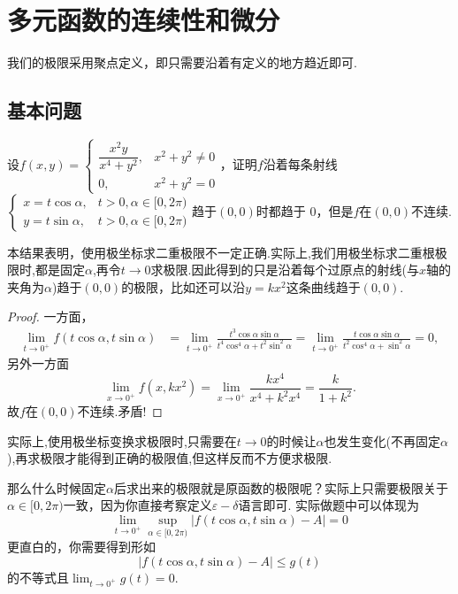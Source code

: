\documentclass[../../main.tex]{subfiles}%
\begin{document}
\section{多元函数的连续性和微分}

我们的极限采用聚点定义，即只需要沿着有定义的地方趋近即可.

\subsection{基本问题}

\begin{example}
设\(f(x,y)=\begin{cases}\dfrac{x^2 y}{x^4 + y^2},&x^2 + y^2 \neq 0\\0,&x^2 + y^2 = 0\end{cases}\)，证明\(f\)沿着每条射线\(\begin{cases}x = t\cos\alpha,&t > 0,\alpha \in [0,2\pi)\\y = t\sin\alpha,&t > 0,\alpha \in [0,2\pi)\end{cases}\)趋于\((0,0)\)时都趋于 0，但是\(f\)在\((0,0)\)不连续.
\end{example}
\begin{note}
本结果表明，使用极坐标求二重极限不一定正确.实际上,我们用极坐标求二重根极限时,都是固定$\alpha$,再令$t\to 0$求极限.因此得到的只是沿着每个过原点的射线(与$x$轴的夹角为$\alpha$)趋于$(0,0)$的极限，比如还可以沿$y=kx^2$这条曲线趋于$(0,0)$.
\end{note}
\begin{proof}

一方面，
\begin{align*}
\lim_{t \to 0^+} f(t\cos\alpha, t\sin\alpha)&=\lim_{t \to 0^+} \frac{t^3 \cos\alpha \sin\alpha}{t^4 \cos^4 \alpha + t^2 \sin^2 \alpha} = \lim_{t \to 0^+} \frac{t \cos\alpha \sin\alpha}{t^2 \cos^4 \alpha + \sin^2 \alpha} = 0,
\end{align*}
另外一方面
\[
\lim_{x \to 0^+} f(x, kx^2)=\lim_{x \to 0^+} \frac{kx^4}{x^4 + k^2 x^4}=\frac{k}{1 + k^2}.
\]
故\(f\)在\((0,0)\)不连续.矛盾!

\end{proof}
\begin{remark}
实际上,使用极坐标变换求极限时,只需要在$t\to 0$的时候让$\alpha$也发生变化(不再固定$\alpha$),再求极限才能得到正确的极限值,但这样反而不方便求极限.

那么什么时候固定$\alpha$后求出来的极限就是原函数的极限呢？实际上只需要极限关于\(\alpha \in [0,2\pi)\)一致，因为你直接考察定义\(\varepsilon - \delta\)语言即可. 实际做题中可以体现为
\[
\lim_{t \to 0^+} \sup_{\alpha \in [0,2\pi)} |f(t\cos\alpha, t\sin\alpha) - A| = 0
\]
更直白的，你需要得到形如
\[
|f(t\cos\alpha, t\sin\alpha) - A| \leqslant g(t)
\]
的不等式且\(\lim_{t \to 0^+} g(t) = 0\).
\end{remark}
\end{document}
